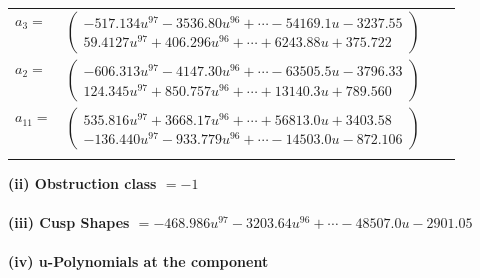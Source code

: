 \documentclass[1p]{elsarticle_modified}
\theoremstyle{definition}
\begin{document}
\begin{tabular}{m{7pt} m{180pt} m{7pt} m{180pt} }
\flushright $a_{3}=$&$\begin{pmatrix}-517.134 u^{97}-3536.80 u^{96}+\cdots-54169.1 u-3237.55\\59.4127 u^{97}+406.296 u^{96}+\cdots+6243.88 u+375.722\end{pmatrix}$ \\
\flushright $a_{2}=$&$\begin{pmatrix}-606.313 u^{97}-4147.30 u^{96}+\cdots-63505.5 u-3796.33\\124.345 u^{97}+850.757 u^{96}+\cdots+13140.3 u+789.560\end{pmatrix}$ \\
\flushright $a_{11}=$&$\begin{pmatrix}535.816 u^{97}+3668.17 u^{96}+\cdots+56813.0 u+3403.58\\-136.440 u^{97}-933.779 u^{96}+\cdots-14503.0 u-872.106\end{pmatrix}$\\&\end{tabular}
\flushleft \textbf{(ii) Obstruction class $= -1$}\\~\\
\flushleft \textbf{(iii) Cusp Shapes $= -468.986 u^{97}-3203.64 u^{96}+\cdots-48507.0 u-2901.05$}\\~\\
\newpage\renewcommand{\arraystretch}{1}
\flushleft \textbf{(iv) u-Polynomials at the component}\newline \\
\end{document}
